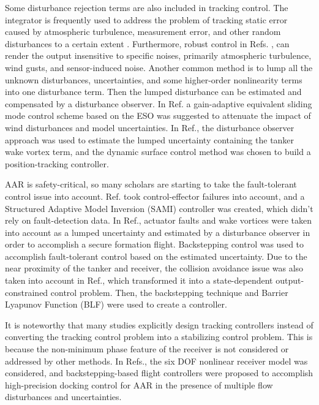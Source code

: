 Some disturbance rejection terms are also included in tracking control.
The integrator is frequently used to address the problem of tracking
static error caused by atmospheric turbulence, measurement error,
and other random disturbances to a certain extent \cite{valasek2002vision}\cite{kimmett2002vision}\cite{fravolini2004modeling}\cite{dogan2009effects}\cite{wang2008novel}.
Furthermore, robust control in Refs. \cite{murillo2008comparison},\cite{fravolini2003development}
can render the output insensitive to specific noises, primarily atmospheric
turbulence, wind gusts, and sensor-induced noise. Another common method
is to lump all the unknown disturbances, uncertainties, and some higher-order
nonlinearity terms into one disturbance term. Then the lumped disturbance
can be estimated and compensated by a disturbance observer\cite{su2018exact}.
In Ref.\cite{duan2020bionic} a gain-adaptive equivalent sliding mode
control scheme based on the ESO was suggested to attenuate the impact
of wind disturbances and model uncertainties. In Ref.\cite{yu2018wake},
the disturbance observer approach was used to estimate the lumped
uncertainty containing the tanker wake vortex term, and the dynamic
surface control method was chosen to build a position-tracking controller.

AAR is safety-critical, so many scholars are starting to take the
fault-tolerant control issue into account\cite{valasek2017fault,yu2018fault,sevil2015fault}.
Ref.\cite{valasek2017fault} took control-effector failures into account,
and a Structured Adaptive Model Inversion (SAMI) controller was created,
which didn't rely on fault-detection data. In Ref.\cite{yu2018fault},
actuator faults and wake vortices were taken into account as a lumped
uncertainty and estimated by a disturbance observer in order to accomplish
a secure formation flight. Backstepping control was used to accomplish
fault-tolerant control based on the estimated uncertainty. Due to
the near proximity of the tanker and receiver, the collision avoidance
issue was also taken into account in Ref.\cite{chang2019robust},
which transformed it into a state-dependent output-constrained control
problem. Then, the backstepping technique and Barrier Lyapunov Function
(BLF) were used to create a controller. 

It is noteworthy that many studies explicitly design tracking controllers
instead of converting the tracking control problem into a stabilizing
control problem. This is because the non-minimum phase feature of
the receiver is not considered or addressed by other methods. In Refs.\cite{su2018exact,su2018probe},
the six DOF nonlinear receiver model was considered, and backstepping-based
flight controllers were proposed to accomplish high-precision docking
control for AAR in the presence of multiple flow disturbances and
uncertainties. 

